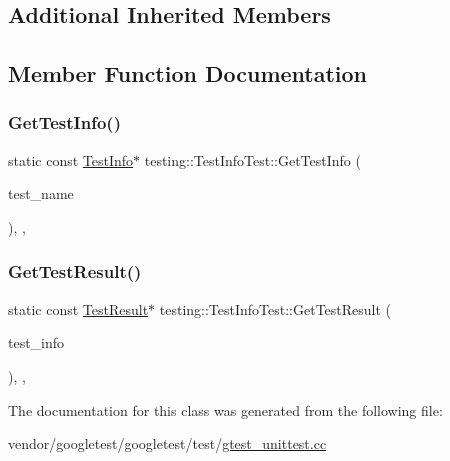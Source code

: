 \subsection*{Additional Inherited Members}


\subsection{Member Function Documentation}
\mbox{\label{classtesting_1_1_test_info_test_a4140c1302bf53c7f1375a23923624f04}} 
\subsubsection{\texorpdfstring{Get\+Test\+Info()}{GetTestInfo()}}
{\footnotesize\ttfamily static const \hyperlink{classtesting_1_1_test_info}{Test\+Info}$\ast$ testing\+::\+Test\+Info\+Test\+::\+Get\+Test\+Info (\begin{DoxyParamCaption}\item[{const char $\ast$}]{test\+\_\+name }\end{DoxyParamCaption})\hspace{0.3cm}{\ttfamily [inline]}, {\ttfamily [static]}, {\ttfamily [protected]}}

\mbox{\label{classtesting_1_1_test_info_test_a154b3679b1aa00ad037ce46eb60d18c3}} 
\subsubsection{\texorpdfstring{Get\+Test\+Result()}{GetTestResult()}}
{\footnotesize\ttfamily static const \hyperlink{classtesting_1_1_test_result}{Test\+Result}$\ast$ testing\+::\+Test\+Info\+Test\+::\+Get\+Test\+Result (\begin{DoxyParamCaption}\item[{const \hyperlink{classtesting_1_1_test_info}{Test\+Info} $\ast$}]{test\+\_\+info }\end{DoxyParamCaption})\hspace{0.3cm}{\ttfamily [inline]}, {\ttfamily [static]}, {\ttfamily [protected]}}



The documentation for this class was generated from the following file\+:\begin{DoxyCompactItemize}
\item 
vendor/googletest/googletest/test/\hyperlink{gtest__unittest_8cc}{gtest\+\_\+unittest.\+cc}\end{DoxyCompactItemize}
